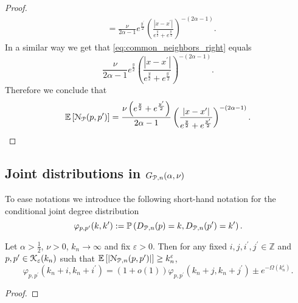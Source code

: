 \begin{appendices}
\begin{proof}
\begin{align*}
    &= \frac{\nu}{2\alpha - 1} e^{\frac{y^\prime}{2}}
    	\left(\frac{|x - x^\prime|}{e^{\frac{y}{2}} + e^{\frac{y^\prime}{2}}}\right)^{-(2\alpha - 1)}.
\end{align*}
In a similar way we get that \eqref{eq:common_neighbors_right} equals
\[
	\frac{\nu}{2\alpha - 1} e^{\frac{y}{2}}
    	\left(\frac{|x - x^\prime|}{e^{\frac{y}{2}} + e^{\frac{y^\prime}{2}}}\right)^{-(2\alpha - 1)}.
\]
Therefore we conclude that
\[
	\mathbb{E}\left[{\mathcal N}_{{\mathcal P}}(p,p^\prime)\right] = \frac{\nu\left(e^{\frac{y}{2}} + e^{\frac{y^\prime}{2}}\right)}{2\alpha - 1}
    	\left(\frac{|x - x^\prime|}{e^{\frac{y}{2}} + e^{\frac{y^\prime}{2}}}\right)^{-(2\alpha - 1)}.
\]
\end{proof}

\subsection{Joint distributions in $G_{{\mathcal P},n}(\alpha,\nu)$}

To ease notations we introduce the following short-hand notation for the conditional joint degree distribution
\[
	\varphi_{p,p^\prime}(k,k^\prime) 
	:= \mathbb{P}\left(D_{{\mathcal P},n}(p) = k, D_{{\mathcal P},n}(p^\prime) = k^\prime\right).
\]

\begin{lemma}\label{lem:joint_degree_distribution_shift}
Let $\alpha > \frac{1}{2}$, $\nu > 0$, $k_n \to \infty$ and fix $\varepsilon > 0$. Then for any fixed $i, j, i^\prime, j^\prime \in \mathbb{Z}$ and $p, p^\prime \in {\mathcal K}_{\varepsilon}(k_n)$ such that $\mathbb{E}\left[\left|{\mathcal N}_{{\mathcal P},n}(p,p^\prime)\right|\right] \ge k_n^{\varepsilon}$,
\[
	\varphi_{p,p^\prime}(k_n + i,k_n + i^\prime) 
	= (1 + o(1))\varphi_{p,p^\prime}(k_n + j,k_n + j^\prime)  \pm e^{-\Omega(k_n^\varepsilon)}.
\]
\end{lemma}

\begin{proof}


\end{proof}
\end{appendices}
